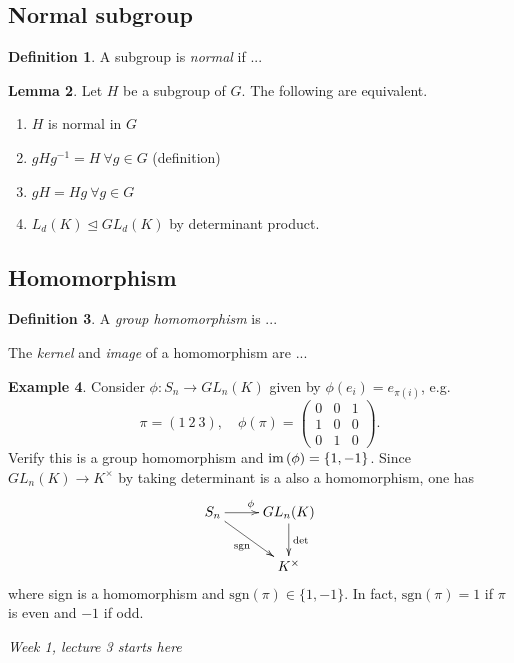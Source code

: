 \documentclass{article}
\newcommand{\sgn}{\text{sgn}}
\newcommand{\im}{\text{im\,}}
\theoremstyle{definition}
\newtheorem{defn}{Definition}[subsection]
\newtheorem{lemma}[defn]{Lemma}
\newtheorem{example}[defn]{Example}
\begin{document}
\subsection{Normal subgroup}

\begin{defn}
A subgroup is \textit{normal} if ...
\end{defn}
\begin{lemma}
Let $H$ be a subgroup of $G$. The following are equivalent.
\begin{enumerate}
\item $H$ is normal in $G$
\item $gHg^{-1}=H \ \forall g\in G$ \qquad (definition)
\item $gH=Hg \ \forall g\in G$
\item $L_d(K)\unlhd GL_d(K)$ by determinant product.
\end{enumerate}
\end{lemma}

\subsection{Homomorphism}

\begin{defn}
A \textit{group homomorphism} is ...

The \textit{kernel} and \textit{image} of a homomorphism are ...
\end{defn}

\begin{example}
\label{example:1stexofrep}
Consider $\phi:S_n\rightarrow GL_n(K)$ given by $\phi(e_i)=e_{\pi(i)}$, e.g.
\[
\pi=(1\ 2\ 3),\quad \phi(\pi)=\begin{pmatrix}
  0 & 0 & 1 \\ 1 & 0 & 0 \\ 0 & 1 & 0
\end{pmatrix}.
\]
Verify this is a group homomorphism and $\im(\phi)=\{1,-1\}$. Since $GL_n(K)\rightarrow K^\times$ by taking determinant is a also a homomorphism, one has
\[
\xymatrix{
    S_n\ar[r]^\phi \ar[dr]_{\sgn} & GL_n(K)\ar[d]^\det  \\ & K^\times
}
\]
where sign is a homomorphism and $\sgn(\pi)\in\{1,-1\}$. In fact, $\sgn(\pi)=1$ if $\pi$ is even and $-1$ if odd.
\end{example}

\begin{flushright}
\textit{Week 1, lecture 3 starts here}
\end{flushright}
\end{document}
